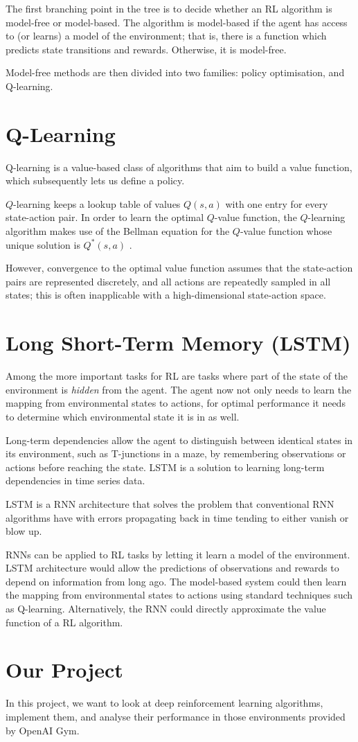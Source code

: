 \documentclass{article}
\begin{document}
The first branching point in the tree is to decide whether an RL algorithm is model-free or model-based. The algorithm is model-based if the agent has access to (or learns) a model of the environment; that is, there is a function which predicts state transitions and rewards. Otherwise, it is model-free.

Model-free methods are then divided into two families: policy optimisation, and Q-learning.

\section{Q-Learning}
Q-learning is a value-based class of algorithms that aim to build a value function, which subsequently lets us define a policy.

$Q$-learning keeps a lookup table of values $Q(s,a)$ with one entry for every state-action pair. In order to learn the optimal $Q$-value function, the $Q$-learning algorithm makes use of the Bellman equation for the $Q$-value function whose unique solution is $Q^*(s,a)$ \cite{DBLP:journals/corr/abs-1811-12560}.

However, convergence to the optimal value function assumes that the state-action pairs are represented discretely, and all actions are repeatedly sampled in all states; this is often inapplicable with a high-dimensional state-action space.

\section{Long Short-Term Memory (LSTM) \cite{RLLSTM}}

Among the more important tasks for RL are tasks where part of the state of the environment is \textit{hidden} from the agent. The agent now not only needs to learn the mapping from environmental states to actions, for optimal performance it needs to determine which environmental state it is in as well.

Long-term dependencies allow the agent to distinguish between identical states in its environment, such as T-junctions in a maze, by remembering observations or actions before reaching the state. LSTM is a solution to learning long-term dependencies in time series data.

LSTM is a RNN architecture that solves the problem that conventional RNN algorithms have with errors propagating back in time tending to either vanish or blow up.

RNNs can be applied to RL tasks by letting it learn a model of the environment. LSTM architecture would allow the predictions of observations and rewards to depend on information from long ago. The model-based system could then learn the mapping from environmental states to actions using standard techniques such as Q-learning. Alternatively, the RNN could directly approximate the value function of a RL algorithm.

\section{Our Project}

In this project, we want to look at deep reinforcement learning algorithms, implement them, and analyse their performance in those environments provided by OpenAI Gym.

\printbibliography
\end{document}

